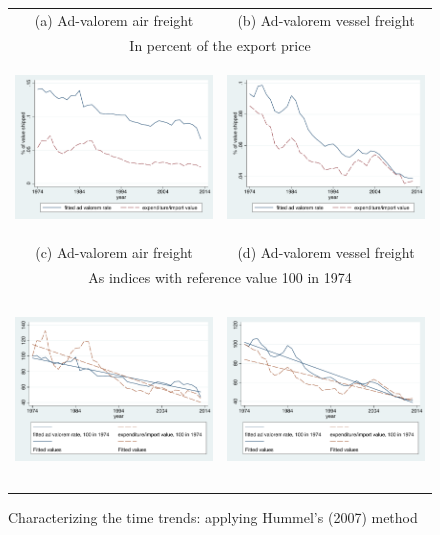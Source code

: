 \documentclass[a4paper,11pt]{article}
\begin{document}
\begin{figure}[htbp]
\caption{Characterizing the time trends: applying Hummel's (2007) method }
\label{fig:comp_effects_as_in_Hummels}
\begin{center}
\begin{tabular}{cc}
{\small (a) Ad-valorem air freight} & {\small (b) Ad-valorem vessel freight}\\
\multicolumn{2}{c}{{\small In percent of the export price}} \\
\includegraphics[width=2.5in, height=1.8in]{figure5_comme_hummels.pdf}
& \includegraphics[width=2.5in,height=1.8in]{figure6_comme_hummels.pdf} \\
{\small (c) Ad-valorem air freight} & {\small (d) Ad-valorem vessel freight}\\
\multicolumn{2}{c}{{\small As indices with reference value 100 in 1974} }\\
\includegraphics[width=2.5in, height=2in]{figure5_comme_hummels_base100.pdf}
& \includegraphics[width=2.5in,height=2in]{figure6_comme_hummels_base100.pdf} \\
\end{tabular}
\end{center}
\end{figure}
\end{document}
